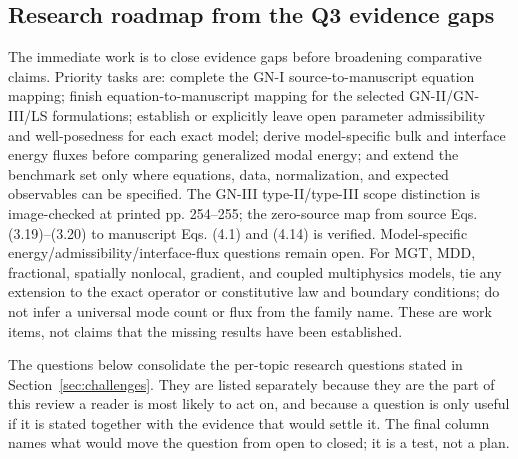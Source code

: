 \subsection{Research roadmap from the Q3 evidence gaps}
\label{sec:q3-roadmap}

The immediate work is to close evidence gaps before broadening comparative claims. Priority tasks are: complete the GN-I source-to-manuscript equation mapping; finish equation-to-manuscript mapping for the selected GN-II/GN-III/LS formulations; establish or explicitly leave open parameter admissibility and well-posedness for each exact model; derive model-specific bulk and interface energy fluxes before comparing generalized modal energy; and extend the benchmark set only where equations, data, normalization, and expected observables can be specified. The GN-III type-II/type-III scope distinction is image-checked at printed pp. 254–255; the zero-source map from source Eqs. (3.19)–(3.20) to manuscript Eqs. (4.1) and (4.14) is verified. Model-specific energy/admissibility/interface-flux questions remain open. For MGT, MDD, fractional, spatially nonlocal, gradient, and coupled multiphysics models, tie any extension to the exact operator or constitutive law and boundary conditions; do not infer a universal mode count or flux from the family name. These are work items, not claims that the missing results have been established.


The questions below consolidate the per-topic research questions stated in Section~\ref{sec:challenges}. They are listed separately because they are the part of this review a reader is most likely to act on, and because a question is only useful if it is stated together with the evidence that would settle it. The final column names what would move the question from open to closed; it is a test, not a plan.

